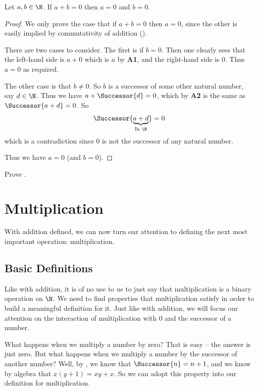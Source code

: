 \begin{proposition}\label{prop:addition-that-equals-zero}
    Let $a, b \in \N$. If $a + b = 0$ then $a = 0$ and $b = 0$.
\end{proposition}
\begin{proof}
    We only prove the case that if $a + b = 0$ then $a = 0$, since the other is easily implied by commutativity of addition ().

    There are two cases to consider. The first is if $b = 0$. Then one clearly sees that the left-hand side is $a + 0$ which is $a$ by \textbf{A1}, and the right-hand side is 0. Thus $a = 0$ as required.

    The other case is that $b \neq 0$. So $b$ is a successor of some other natural number, say $d \in \N$. Thus we have $a + \Successor{d} = 0$, which by \textbf{A2} is the same as $\Successor{a + d} = 0$. So
    \[
        \Successor{\underbrace{a + d}_{\text{In } \N}} = 0
    \]
    which is a contradiction since 0 is not the successor of any natural number.

    Thus we have $a = 0$ (and $b = 0$).
\end{proof}

\begin{exercise}\label{exercise:addition-that-equals-self}
    Prove .
\end{exercise}

\section{Multiplication}
With addition defined, we can now turn our attention to defining the next most important operation: multiplication.

\subsection{Basic Definitions}
Like with addition, it is of no use to us to just say that multiplication is a binary operation on $\N$. We need to find properties that multiplication satisfy in order to build a meaningful definition for it. Just like with addition, we will focus our attention on the interaction of multiplication with 0 and the successor of a number.

What happens when we multiply a number by zero? That is easy -- the answer is just zero. But what happens when we multiply a number by the successor of another number? Well, by , we know that $\Successor{n} = n + 1$, and we know by algebra that $x(y + 1) = xy + x$. So we can adopt this property into our definition for multiplication.

